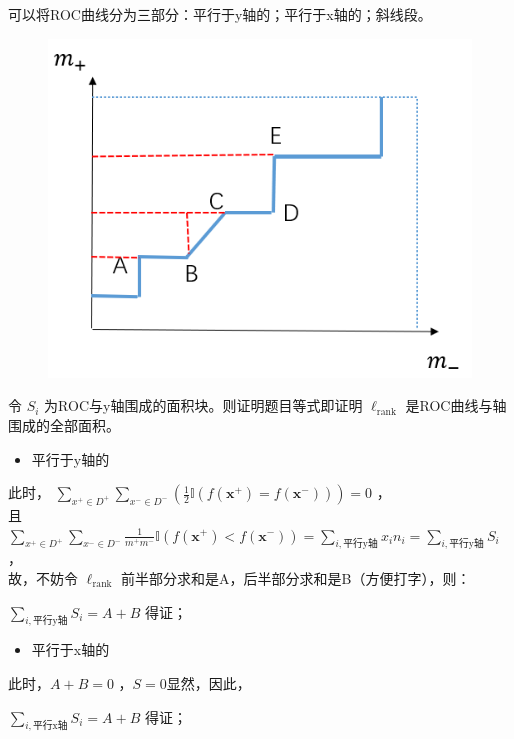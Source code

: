 \documentclass[UTF8,a4paper,AutoFakeBold,AutoFakeSlant]{article}
\begin{document}
可以将ROC曲线分为三部分：平行于y轴的；平行于x轴的；斜线段。
\begin{figure}[H]
  \centering
  \includegraphics[scale=0.325]{2_5.png}
  \label{f4}
\end{figure}

令 $S_i$ 为ROC与y轴围成的面积块。则证明题目等式即证明 $\ell_{\mathrm{rank}}$ 是ROC曲线与轴围成的全部面积。

\begin{itemize}
  \item 平行于y轴的
\end{itemize}
此时，
$ \sum_{x^{+} \in D^{+}} \sum_{x^{-} \in D^{-}}\left( \frac{1}{2} \mathbb{I}\left(f\left(\boldsymbol{x}^{+}\right)=f\left(\boldsymbol{x}^{-}\right)\right) \right)= 0 $ ，\\
且$ \sum_{x^{+} \in D^{+}}\sum_{x^{-} \in D^{-}}\frac{1}{m^{+} m^{-}}\mathbb{I}\left(f\left(\boldsymbol{x}^{+}\right)<f\left(\boldsymbol{x}^{-}\right)\right) = \sum_{i,\text{平行y轴}} x_i n_i = \sum_{i,\text{平行y轴}} S_i $ ，\\
故，不妨令 $ \ell_{\mathrm{rank}} $ 前半部分求和是A，后半部分求和是B（方便打字），则：

$ \sum_{i,\text{平行y轴}} S_i  = A+B $ 得证；

\begin{itemize}
  \item 平行于x轴的
\end{itemize}
此时，$A+B=0$ ，$S=0$显然，因此，

$ \sum_{i,\text{平行x轴}}  S_i = A+B $ 得证；
\end{document}
